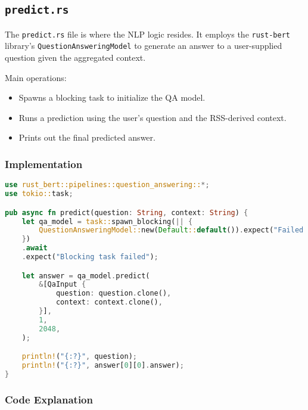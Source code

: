 \subsection{\lstinline{predict.rs}}
The \lstinline{predict.rs} file is where the NLP logic resides. It employs the \lstinline{rust-bert} library’s \lstinline{QuestionAnsweringModel} to generate an answer to a user-supplied question given the aggregated context.

Main operations:
\begin{itemize}
    \item Spawns a blocking task to initialize the QA model.
    \item Runs a prediction using the user’s question and the RSS-derived context.
    \item Prints out the final predicted answer.
\end{itemize}

\subsubsection{Implementation}
\begin{lstlisting}[language=rust]
use rust_bert::pipelines::question_answering::*;
use tokio::task;

pub async fn predict(question: String, context: String) {
    let qa_model = task::spawn_blocking(|| {
        QuestionAnsweringModel::new(Default::default()).expect("Failed to create QA model")
    })
    .await
    .expect("Blocking task failed");

    let answer = qa_model.predict(
        &[QaInput {
            question: question.clone(),
            context: context.clone(),
        }],
        1,
        2048,
    );

    println!("{:?}", question);
    println!("{:?}", answer[0][0].answer);
}
\end{lstlisting}

\subsubsection{Code Explanation}

